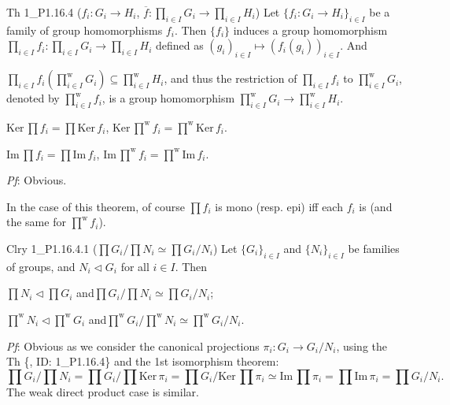 \documentclass{article}
\newcommand{\nles}{\vartriangleleft}
\newcommand{\Ker}{\text{Ker}\,}
\newcommand{\Ima}{\text{Im}\,}
\begin{document}
\begin{Th}{Th 1\_P1.16.4 ($f_i: G_i \to H_i$, $\overline{f}: \prod_{i\in I} G_i \to \prod_{i\in I} H_i$)}
    Let $\{f_i: G_i \to H_i\}_{i\in I}$ be a family of group homomorphisms $f_i$. Then $\{f_i\}$ induces a group homomorphism $ \prod_{i\in I} f_i: \prod_{i\in I} G_i \to \prod_{i\in I} H_i$ defined as $(g_i)_{i\in I}\mapsto (f_i(g_i))_{i\in I}$. And
    \begin{compactenum}
        \item $\prod_{i\in I} f_i\left(\prod_{i\in I}^{\text{w}} G_i\right) \subseteq \prod_{i\in I}^{\text{w}} H_i$, and thus the restriction of $\prod_{i\in I} f_i$ to $\prod_{i\in I}^{\text{w}} G_i$, denoted by $\prod_{i\in I}^{\text{w}} f_i$, is a group homomorphism $\prod_{i\in I}^{\text{w}} G_i \to \prod_{i\in I}^{\text{w}} H_i$. 
        \item $\Ker \prod f_i = \prod \Ker f_i$, $\Ker \prod^{\text{w}} f_i = \prod^{\text{w}} \Ker f_i$.
        \item $\Ima \prod f_i = \prod \Ima f_i$, $\Ima \prod^{\text{w}} f_i = \prod^{\text{w}} \Ima f_i$.
    \end{compactenum}
    \tcblower
    \textit{Pf}: Obvious. 
\end{Th}

\begin{Rmk}{}
    In the case of this theorem, of course $\prod f_i$ is mono (resp. epi) iff each $f_i$ is (and the same for $\prod^{\text{w}} f_i$).
\end{Rmk}

\begin{Th}{Clry 1\_P1.16.4.1 ($\prod G_i\big/ \prod N_i \simeq \prod G_i/N_i$)}
    Let $\{G_i\}_{i\in I}$ and $\{N_i\}_{i\in I}$ be families of groups, and $N_i\nles G_i$ for all $i\in I$. Then
    \begin{compactenum}
        \item $\prod N_i\nles \prod G_i$ \quad and\quad $\prod G_i\big/ \prod N_i \simeq \prod G_i/N_i$;
        \item $\prod^{\text{w}} N_i\nles \prod^{\text{w}} G_i$ \quad and\quad $\prod^{\text{w}} G_i\big/ \prod^{\text{w}} N_i \simeq \prod^{\text{w}} G_i/N_i$.
    \end{compactenum}
    \tcblower
    \textit{Pf}: Obvious as we consider the canonical projections $\pi_i: G_i \to G_i/N_i$, using the Th \{, ID: 1\_P1.16.4\} and the 1st isomorphism theorem:
    $$ \prod G_i\big/ \prod N_i = \prod G_i\big/ \prod \Ker \pi_i = \prod G_i\big/ \Ker \prod \pi_i \simeq \Ima \prod \pi_i = \prod \Ima \pi_i = \prod G_i/N_i. $$
    The weak direct product case is similar.
\end{Th}
\end{document}
